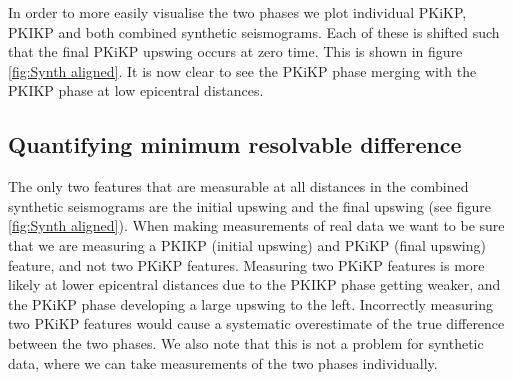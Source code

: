 \documentclass[11pt,a4paper]{article}
\begin{document}
In order to more easily visualise the two phases we plot individual PKiKP, PKIKP and both combined synthetic seismograms. Each of these is shifted such that the final PKiKP upswing occurs at zero time. This is shown in figure \ref{fig:Synth aligned}. It is now clear to see the PKiKP phase merging with the PKIKP phase at low epicentral distances.

\subsection{Quantifying minimum resolvable difference}
The only two features that are measurable at all distances in the combined synthetic seismograms are the initial upswing and the final upswing (see figure \ref{fig:Synth aligned}). When making measurements of real data we want to be sure that we are measuring a PKIKP (initial upswing) and PKiKP (final upswing) feature, and not two PKiKP features. Measuring two PKiKP features is more likely at lower epicentral distances due to the PKIKP phase getting weaker, and the PKiKP phase developing a large upswing to the left. Incorrectly measuring two PKiKP features would cause a systematic overestimate of the true difference between the two phases. We also note that this is not a problem for synthetic data, where we can take measurements of the two phases individually.
\end{document}
